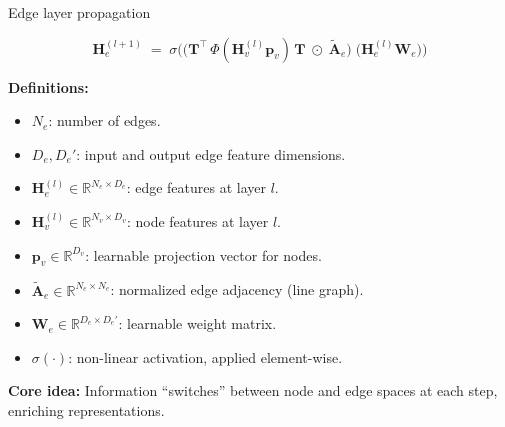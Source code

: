 \documentclass[hyperref={colorlinks,citecolor=blue,linkcolor=blue,urlcolor=blue}]{beamer}
\begin{document}
\begin{frame}{Edge layer propagation}
\footnotesize

\[
\mathbf{H}_e^{(l+1)} \;=\; \sigma\Big(
\big( \mathbf{T}^\top \,\Phi(\mathbf{H}_v^{(l)}\mathbf{p}_v)\,\mathbf{T} \;\odot\; \tilde{\mathbf{A}}_e \big)
\; \big(\mathbf{H}_e^{(l)} \mathbf{W}_e \big)
\Big)
\]

\vspace{0.5cm}

\textbf{Definitions:}
\begin{itemize}\footnotesize
    \item \(N_e\): number of edges.
    \item \(D_e, D_e'\): input and output edge feature dimensions.
    \item \(\mathbf{H}_e^{(l)} \in \mathbb{R}^{N_e \times D_e}\): edge features at layer \(l\).
    \item \(\mathbf{H}_v^{(l)} \in \mathbb{R}^{N_v \times D_v}\): node features at layer \(l\).
    \item \(\mathbf{p}_v \in \mathbb{R}^{D_v}\): learnable projection vector for nodes.
    \item \(\tilde{\mathbf{A}}_e \in \mathbb{R}^{N_e \times N_e}\): normalized edge adjacency (line graph).
    \item \(\mathbf{W}_e \in \mathbb{R}^{D_e \times D_e'}\): learnable weight matrix.
    \item \(\sigma(\cdot)\): non-linear activation, applied element-wise.
\end{itemize}
\textbf{Core idea:} Information “switches” between node and edge spaces at each step, enriching representations.

\end{frame}
\end{document}
